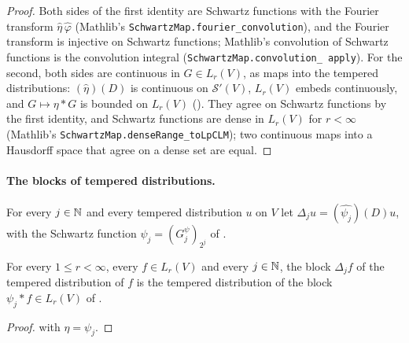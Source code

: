 \begin{proof}
\leanok
Both sides of the first identity are Schwartz functions with the Fourier transform $\widehat\eta \,
\widehat\varphi$ (Mathlib's \texttt{SchwartzMap.\allowbreak fourier\_\allowbreak convolution}), and
the Fourier transform is injective on Schwartz functions; Mathlib's convolution of Schwartz
functions is the convolution integral (\texttt{SchwartzMap.\allowbreak convolution\_\allowbreak
apply}). For the second, both sides are continuous in $G \in L_r(V)$, as maps into the tempered
distributions: $(\widehat\eta)(D)$ is continuous on $\mathcal S'(V)$, $L_r(V)$ embeds continuously,
and $G \mapsto \eta * G$ is bounded on $L_r(V)$ (). They agree on Schwartz
functions by the first identity, and Schwartz functions are dense in $L_r(V)$ for $r < \infty$
(Mathlib's \texttt{SchwartzMap.\allowbreak denseRange\_\allowbreak toLpCLM}); two continuous maps
into a Hausdorff space that agree on a dense set are equal.
\end{proof}

\paragraph{The blocks of tempered distributions.}

\begin{definition}
\label{def:distrib-block}
\leanok
{}
For every $j \in \mathbb{N}$ and every tempered distribution $u$ on $V$ let
$\Delta_j u = (\widehat{\psi_j})(D) u$, with the Schwartz function $\psi_j = (G^\psi_j)_{2^j}$
of .
\end{definition}

\begin{lemma}
\label{lem:distrib-block-lp}
\leanok
{}
For every $1 \leq r < \infty$, every $f \in L_r(V)$ and every $j \in \mathbb{N}$, the block $\Delta_j f$
of the tempered distribution of $f$ is the tempered distribution of the block
$\psi_j * f \in L_r(V)$ of .
\end{lemma}

\begin{proof}
\leanok
{} with $\eta = \psi_j$.
\end{proof}

